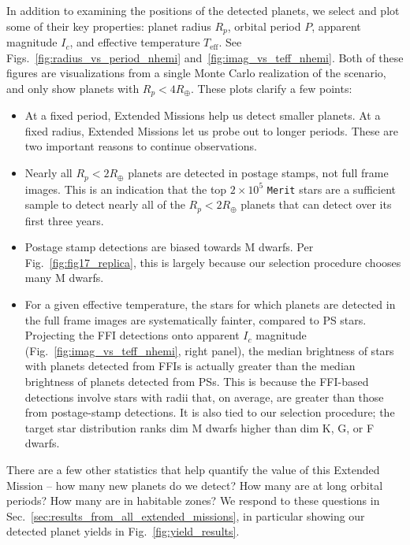 In addition to examining the positions of the detected planets, we select and plot some of their key properties:
planet radius $R_p$, orbital period $P$, apparent magnitude $I_c$, and effective temperature $T_\mathrm{eff}$.
See Figs.~\ref{fig:radius_vs_period_nhemi} and~\ref{fig:imag_vs_teff_nhemi}.
Both of these figures are visualizations from a single Monte Carlo realization of the \nhemi\:scenario, and only show planets with $R_p < 4R_\oplus$.
These plots clarify a few points:
\begin{itemize}
	\item At a fixed period, Extended Missions help us detect smaller planets. 
	At a fixed radius, Extended Missions let us probe out to longer periods. 
	These are two important reasons to continue \tesss observations.
	\item Nearly all $R_p<2R_\oplus$ planets are detected in postage stamps, 
	not full frame images. This is an indication that the top $2\times10^5$ 
	\texttt{Merit} stars are a sufficient sample to detect nearly all of the 
	$R_p<2R_\oplus$ planets that \tess can detect over its first three years.
	\item Postage stamp detections are biased towards M dwarfs. Per Fig.~\ref{fig:fig17_replica}, this is largely because our selection procedure chooses many M dwarfs.
	\item For a given effective temperature, the stars for which planets are 
	detected in the full frame images are systematically fainter, compared to 
	PS stars. Projecting the FFI detections onto apparent $I_c$ magnitude 
	(Fig.~\ref{fig:imag_vs_teff_nhemi}, right panel), the median brightness of 
	stars with planets detected from FFIs is actually greater than the median 
	brightness of planets detected from PSs. This is because the FFI-based 
	detections involve stars with radii that, on average, are greater than 
	those from postage-stamp detections. It is also tied to our selection 
	procedure; the target star distribution ranks dim M dwarfs higher than
	dim K, G, or F dwarfs.
\end{itemize}

There are a few other statistics that help quantify the value of this 
Extended Mission -- how many new 
planets do we detect? How many are at long orbital periods? How many 
are in habitable zones? We respond to these questions in 
Sec.~\ref{sec:results_from_all_extended_missions}, in particular 
showing our detected planet yields in Fig.~\ref{fig:yield_results}.
